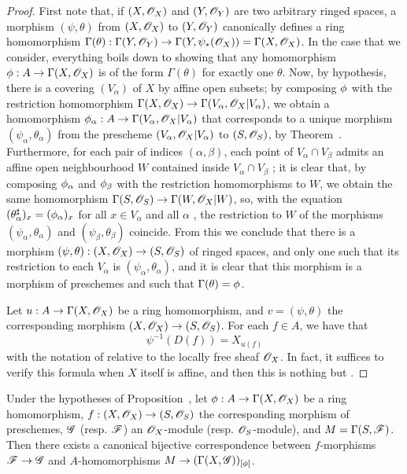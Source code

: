 \begin{proof}
First note that, if $(X,\mathscr{O}_X)$ and $(Y,\mathscr{O}_Y)$ are two arbitrary ringed spaces,
a morphism $(\psi,\theta)$ from $(X,\mathscr{O}_X)$ to $(Y,\mathscr{O}_Y)$ canonically defines a ring homomorphism $\Gamma(\theta):\Gamma(Y,\sh{O}_Y)\to\Gamma(Y,\psi_*(\sh{O}_X))=\Gamma(X,\sh{O}_X)$.
In the case that we consider, everything boils down to showing that any homomorphism $\vphi:A\to\Gamma(X,\sh{O}_X)$ is of the form $\Gamma(\theta)$ for exactly one $\theta$.
Now, by hypothesis, there is a covering $(V_\alpha)$ of $X$ by affine open subsets;
by composing $\phi$ with the restriction homomorphism $\Gamma(X,\sh{O}_X)\to\Gamma(V_\alpha,\sh{O}_X|V_\alpha)$, we obtain a homomorphism $\vphi_\alpha:A\to\Gamma(V_\alpha,\sh{O}_X|V_\alpha)$ that corresponds to a unique morphism $(\psi_\alpha,\theta_\alpha)$ from the prescheme $(V_\alpha,\mathscr{O}_X|V_\alpha)$ to $(S,\mathscr{O}_S)$, by Theorem~.
Furthermore, for each pair of indices $(\alpha,\beta)$, each point of $V_\alpha\cap V_\beta$ admits an affine open neighbourhood $W$ contained inside $V_\alpha\cap V_\beta$ ;
it is clear that, by composing $\phi_\alpha$ and $\phi_\beta$ with the restriction homomorphisms to $W$, we obtain the same homomorphism $\Gamma(S,\sh{O}_S)\to\Gamma(W,\sh{O}_X|W)$, so, with the equation $(\theta_\alpha^\sharp)_x=(\phi_\alpha)_x$ for all $x\in V_\alpha$ and all $\alpha$ , the restriction to $W$ of the morphisms $(\psi_\alpha,\theta_\alpha)$ and $(\psi_\beta,\theta_\beta)$ coincide.
From this we conclude that there is a morphism $(\psi,\theta):(X,\sh{O}_X)\to(S,\sh{O}_S)$ of ringed spaces, and only one such that its restriction to each $V_\alpha$ is $(\psi_\alpha,\theta_\alpha)$, and it is clear that this morphism is a morphism of preschemes and such that $\Gamma(\theta)=\phi$.

Let $u:A\to\Gamma(X,\sh{O}_X)$ be a ring homomorphism, and $v=(\psi,\theta)$ the corresponding morphism $(X,\sh{O}_X)\to(S,\sh{O}_S)$.
For each $f\in A$, we have that
\[
  \label{I.2.2.4.1}
  \psi^{-1}(D(f))=X_{u(f)}
  \tag{2.2.4.1}
\]
with the notation of  relative to the locally free sheaf $\mathscr{O}_X$.
In fact, it suffices to verify this formula when $X$ itself is affine, and then this is nothing but .
\end{proof}

\begin{proposition}[2.2.5]
\label{I.2.2.5}
Under the hypotheses of Proposition~, let $\vphi:A\to\Gamma(X,\sh{O}_X)$ be a ring homomorphism, $f:(X,\sh{O}_X)\to(S,\sh{O}_S)$ the corresponding morphism of preschemes, $\mathscr{G}$ (resp. $\mathscr{F}$) an $\mathscr{O}_X$-module (resp. $\mathscr{O}_S$-module), and $M=\Gamma(S,\mathscr{F})$.
Then there exists a canonical bijective
correspondence between $f$-morphisms $\sh{F}\to\sh{G}$  and $A$-homomorphisms $M\to(\Gamma(X,\sh{G}))_{[\vphi]}$.
\end{proposition}

